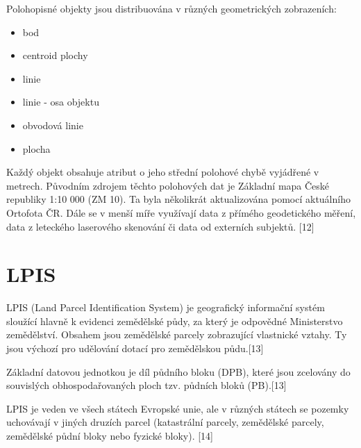 \documentclass[a4paper,oneside,12pt]{book}
\begin{document}
\hspace{10mm} Polohopisné objekty jsou distribuována v různých geometrických zobrazeních:
\begin{itemize}
\item bod
\item centroid plochy
\item linie
\item linie - osa objektu
\item obvodová linie
\item plocha
\end{itemize}

\hspace{10mm} Každý objekt obsahuje atribut o jeho střední polohové chybě vyjádřené v metrech. Původním zdrojem těchto polohových dat je Základní mapa České republiky 1:10 000 (ZM 10). Ta byla několikrát aktualizována pomocí aktuálního Ortofota ČR. Dále se v menší míře využívají data z přímého geodetického měření, data z leteckého laserového
skenování či data od externích subjektů. [12] 


\section{LPIS} \label{lpis}
\hspace{10mm} LPIS (Land Parcel Identification System) je geografický informační systém sloužící hlavně k evidenci zemědělské půdy, za který je odpovědné Ministerstvo zemědělství. Obsahem jsou zemědělské parcely zobrazující vlastnické vztahy. Ty jsou výchozí pro udělování dotací pro zemědělskou půdu.[13] 

\hspace{10mm} Základní datovou jednotkou je díl půdního bloku (DPB), které jsou zcelovány do souvislých obhospodařovaných ploch tzv. půdních bloků (PB).[13]

\hspace{10mm} LPIS je veden ve všech státech Evropské unie, ale v různých státech se pozemky uchovávají v jiných druzích parcel (katastrální parcely, zemědělské parcely, zemědělské půdní bloky nebo fyzické bloky). [14]
\end{document}
